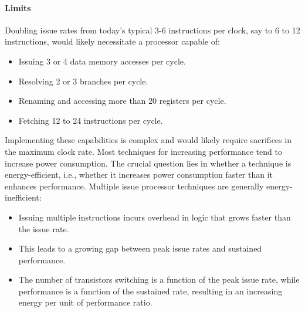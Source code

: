\paragraph*{Limits}
Doubling issue rates from today's typical 3-6 instructions per clock, say to 6 to 12 instructions, would likely necessitate a processor capable of:
\begin{itemize}
    \item Issuing 3 or 4 data memory accesses per cycle.
    \item Resolving 2 or 3 branches per cycle.
    \item Renaming and accessing more than 20 registers per cycle.
    \item Fetching 12 to 24 instructions per cycle.
\end{itemize}
Implementing these capabilities is complex and would likely require sacrifices in the maximum clock rate. 
Most techniques for increasing performance tend to increase power consumption.
The crucial question lies in whether a technique is energy-efficient, i.e., whether it increases power consumption faster than it enhances performance.
Multiple issue processor techniques are generally energy-inefficient:
\begin{itemize}
    \item Issuing multiple instructions incurs overhead in logic that grows faster than the issue rate.
    \item This leads to a growing gap between peak issue rates and sustained performance.
    \item The number of transistors switching is a function of the peak issue rate, while performance is a function of the sustained rate, resulting in an increasing energy per unit of performance ratio.
\end{itemize}

